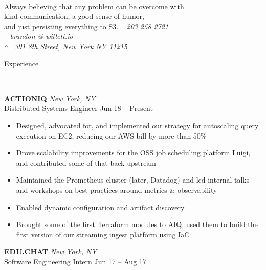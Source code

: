 \documentclass[letterpaper]{article}
\begin{document}
	\begin{bgbox}[height=\paperheight, colback=white, width=0.62\textwidth]\raggedright
		\vspace*{9pt}
		\begin{bgbox}[height=1.60in, colback=gray!15, width=\textwidth, top=0.05in]
			\\
			Always believing that any problem can be overcome with \\
			kind communication, a good sense of humor, \\
			and just persisting everything to S3. \hfill {\large\Telefon}~ \textit{203 258 2721} \\
			\null \hfill {\large\Letter}~ \textit{brandon @ willett.io } \\
			\null \hfill $\house$~ \textit{391 8th Street, New York NY 11215}
		\end{bgbox}\vspace*{25.5pt}
		{\Huge{Experience}}\\[-6pt]
		\noindent\rule{\textwidth}{1pt}\\[12pt]
		\textbf{ACTIONIQ} \hfill \textit{New York, NY}\\
		Distributed Systems Engineer \hfill Jun 18 -- Present
		\begin{itemize} [noitemsep,topsep=4pt]
			\item Designed, advocated for, and implemented our strategy for autoscaling query execution on EC2, reducing our AWS bill by more than 50\%
			\item Drove scalability improvements for the OSS job scheduling platform Luigi, and contributed some of that back upstream
			\item Maintained the Prometheus cluster (later, Datadog) and led internal talks and workshops on best practices around metrics \& observability
			\item Enabled dynamic configuration and artifact discovery
			\item Brought some of the first Terraform modules to AIQ, used them to build \linebreak the first version of our streaming ingest platform using IaC
		\end{itemize}
		\vspace*{12pt}
		\textbf{EDU.CHAT} \hfill \textit{New York, NY}\\
		Software Engineering Intern \hfill Jun 17 -- Aug 17
		\begin{itemize} [noitemsep,topsep=4pt]

\end{itemize}
\end{bgbox}
\end{document}
